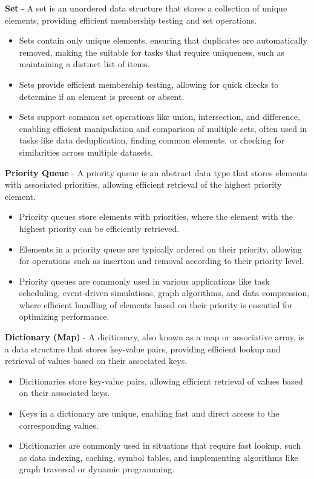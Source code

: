 \begin{solution}
    \noindent \textbf{Set} - A set is an unordered data structure that stores a collection of unique elements, providing efficient membership testing and set operations.
    \begin{itemize}
        \item Sets contain only unique elements, ensuring that duplicates are automatically removed, making the suitable for tasks that require uniqueness, such as maintaining a distinct
        list of items.
        \item Sets provide efficient membership testing, allowing for quick checks to determine if an element is present or absent.
        \item Sets support common set operations like union, intersection, and difference, enabling efficient manipulation and comparison of multiple sets, often used in tasks like data
        deduplication, finding common elements, or checking for similarities across multiple datasets.
    \end{itemize}
    
    \noindent \textbf{Priority Queue} - A priority queue is an abstract data type that stores elements with associated priorities, allowing efficient retrieval of the highest priority element.
    \begin{itemize}
        \item Priority queues store elements with priorities, where the element with the highest priority can be efficiently retrieved.
        \item Elements in a priority queue are typically ordered on their priority, allowing for operations such as insertion and removal according to their priority level.
        \item Priority queues are commonly used in various applications like task scheduling, event-driven simulations, graph algorithms, and data compression, where efficient handling of elements
        based on their priority is essential for optimizing performance.
    \end{itemize}

    \noindent \textbf{Dictionary (Map)} - A dicitionary, also known as a map or associative array, is a data structure that stores key-value pairs, providing efficient lookup and retrieval of values
    based on their associated keys.
    \begin{itemize}
        \item Dicitionaries store key-value pairs, allowing efficient retrieval of values based on their associated keys.
        \item Keys in a dictionary are unique, enabling fast and direct access to the corresponding values.
        \item Dicitionaries are commonly used in situations that require fast lookup, such as data indexing, caching, symbol tables, and implementing algorithms like graph traversal or dynamic programming.
    \end{itemize}
\end{solution}

